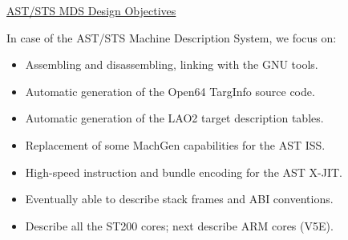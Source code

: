 \documentclass[a4]{seminar}
\begin{document}
\begin{slide}


\begin{center} \underline{AST/STS MDS Design Objectives} \end{center}

In case of the AST/STS Machine Description System, we focus on:
\begin{itemize}

\item Assembling and disassembling, linking with the GNU tools.

\item Automatic generation of the Open64 TargInfo source code.

\item Automatic generation of the LAO2 target description tables.

\item Replacement of some MachGen capabilities for the AST ISS.

\item High-speed instruction and bundle encoding for the AST X-JIT.

\item Eventually able to describe stack frames and ABI conventions.

\item Describe all the ST200 cores; next describe ARM cores (V5E).

\end{itemize}

\end{slide}
\end{document}
